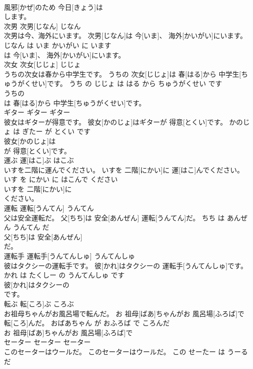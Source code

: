 \documentclass[8pt]{extreport}
\begin{document}
\begin{CJK}{UTF8}{min}
\\	風邪[かぜ]のため 今日[きょう]は
\\	します。			
\\	次男	次男[じなん]	じなん	
\\	次男は今、海外にいます。	次男[じなん]は 今[いま]、 海外[かいがい]にいます。	じなん は いま かいがい に います	
\\	は 今[いま]、 海外[かいがい]にいます。			
\\	次女	次女[じじょ]	じじょ	
\\	うちの次女は春から中学生です。	うちの 次女[じじょ]は 春[はる]から 中学生[ちゅうがくせい]です。	うち の じじょ は はる から ちゅうがくせい です	
\\	うちの
\\	は 春[はる]から 中学生[ちゅうがくせい]です。			
\\	ギター	ギター	ギター	
\\	彼女はギターが得意です。	彼女[かのじょ]はギターが 得意[とくい]です。	かのじょ は ぎたー が とくい です	
\\	彼女[かのじょ]は
\\	が 得意[とくい]です。			
\\	運ぶ	運[はこ]ぶ	はこぶ	
\\	いすを二階に運んでください。	いすを 二階[にかい]に 運[はこ]んでください。	いす を にかい に はこんで ください	
\\	いすを 二階[にかい]に
\\	ください。			
\\	運転	運転[うんてん]	うんてん	
\\	父は安全運転だ。	父[ちち]は 安全[あんぜん] 運転[うんてん]だ。	ちち は あんぜん うんてん だ	
\\	父[ちち]は 安全[あんぜん]
\\	だ。			
\\	運転手	運転手[うんてんしゅ]	うんてんしゅ	
\\	彼はタクシーの運転手です。	彼[かれ]はタクシーの 運転手[うんてんしゅ]です。	かれ は たくしー の うんてんしゅ です	
\\	彼[かれ]はタクシーの
\\	です。			
\\	転ぶ	転[ころ]ぶ	ころぶ	
\\	お祖母ちゃんがお風呂場で転んだ。	お 祖母[ばあ]ちゃんがお 風呂場[ふろば]で 転[ころ]んだ。	おばあちゃん が おふろば で ころんだ	
\\	お 祖母[ばあ]ちゃんがお 風呂場[ふろば]で
\\	セーター	セーター	セーター	
\\	このセーターはウールだ。	このセーターはウールだ。	この せーたー は うーる だ	

\end{CJK}
\end{document}
